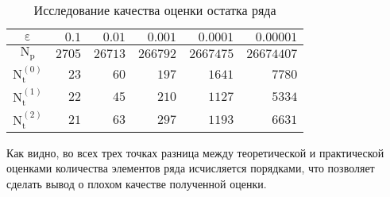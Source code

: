 \begin{table}[!hbtp]
  \centering
  \caption{Исследование качества оценки остатка ряда}
  \begin{tabular}{|c|r|r|r|r|r|}
    \hline
    $\mathrm{\varepsilon}$ & $0.1$ & $0.01$ & $0.001$ & $0.0001$ & $0.00001$ \\
    \hline
    $\mathrm{N_p}$ & $2705$ & $26713$ & $266792$ & $2667475$ & $26674407$ \\
    \hline
    $\mathrm{N_t^{(0)}}$ & $23$ & $60$ & $197$ & $1641$ & $7780$ \\
    \hline
    $\mathrm{N_t^{(1)}}$ & $22$ & $45$ & $210$ & $1127$ & $5334$ \\
    \hline
    $\mathrm{N_t^{(2)}}$ & $21$ & $63$ & $297$ & $1193$ & $6631$ \\
    \hline
  \end{tabular}
  \label{tab:rem:experiment}
\end{table}

Как видно, во всех трех точках разница между теоретической и практической оценками количества элементов ряда исчисляется порядками,
что позволяет сделать вывод о плохом качестве полученной оценки.
